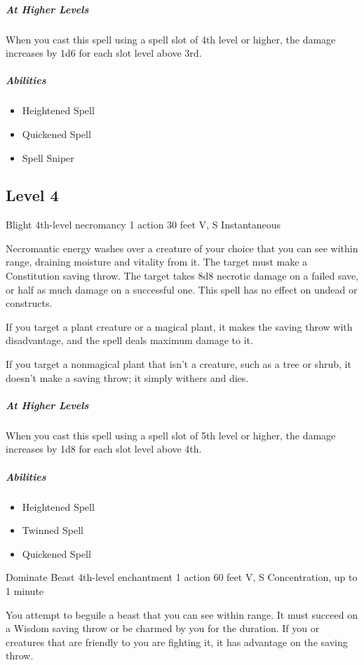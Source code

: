 \documentclass[letterpaper,openany,oneside,twocolumn]{book}
\begin{document}
\subparagraph*{At Higher Levels} When you cast this spell using a spell slot of 4th level or higher, the damage increases by 1d6 for each slot level above 3rd.

\subparagraph*{Abilities}
\begin{itemize}
  \item Heightened Spell
  \item Quickened Spell
  \item Spell Sniper
\end{itemize}

\subsection*{Level 4}

\DndSpellHeader
  {Blight}
  {4th-level necromancy}
  {1 action}
  {30 feet}
  {V, S}
  {Instantaneous}

Necromantic energy washes over a creature of your choice that you can see within range, draining moisture and vitality from it. The target must make a Constitution saving throw. The target takes 8d8 necrotic damage on a failed save, or half as much damage on a successful one. This spell has no effect on undead or constructs. 

If you target a plant creature or a magical plant, it makes the saving throw with disadvantage, and the spell deals maximum damage to it. 

If you target a nonmagical plant that isn't a creature, such as a tree or shrub, it doesn't make a saving throw; it simply withers and dies.

\subparagraph*{At Higher Levels} When you cast this spell using a spell slot of 5th level or higher, the damage increases by 1d8 for each slot level above 4th.

\subparagraph*{Abilities}
\begin{itemize}
  \item Heightened Spell
  \item Twinned Spell
  \item Quickened Spell
\end{itemize}

\DndSpellHeader
  {Dominate Beast}
  {4th-level enchantment}
  {1 action}
  {60 feet}
  {V, S}
  {Concentration, up to 1 minute}

You attempt to beguile a beast that you can see within range. It must succeed on a Wisdom saving throw or be charmed by you for the duration. If you or creatures that are friendly to you are fighting it, it has advantage on the saving throw. 
\end{document}
